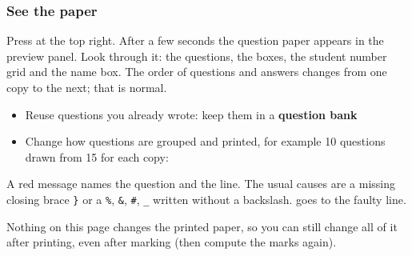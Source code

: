 \documentclass[11pt]{article}
\begin{document}
\subsubsection{See the paper}

Press  at the top right. After a few seconds the question paper appears in the preview panel. Look through it: the questions, the boxes, the student number grid and the name box. The order of questions and answers changes from one copy to the next; that is normal.

\begin{tip}
\begin{itemize}
  \item Reuse questions you already wrote: keep them in a \textbf{question bank} 
  \item Change how questions are grouped and printed, for example 10 questions drawn from 15 for each copy: 
\end{itemize}
\end{tip}

\begin{careful}
A red message names the question and the line. The usual causes are a missing closing brace \texttt{\}} or a \texttt{\%}, \texttt{\&}, \texttt{\#}, \texttt{\_} written without a backslash.  goes to the faulty line.
\end{careful}

\label{step:marking}

Nothing on this page changes the printed paper, so you can still change all of it after printing, even after marking (then compute the marks again).
\end{document}
